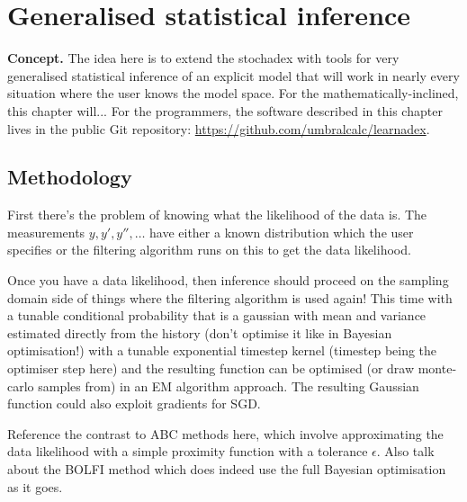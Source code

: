 \chapter{\sffamily Generalised statistical inference}

{\bfseries\sffamily Concept.} The idea here is to extend the stochadex with tools for very generalised statistical inference of an explicit model that will work in nearly every situation where the user knows the model space. For the mathematically-inclined, this chapter will... For the programmers, the software described in this chapter lives in the public Git repository: \href{https://github.com/umbralcalc/learnadex}{https://github.com/umbralcalc/learnadex}.


\section{\sffamily Methodology}

First there's the problem of knowing what the likelihood of the data is. The measurements $y, y', y'', \dots$ have either a known distribution which the user specifies or the filtering algorithm runs on this to get the data likelihood.

Once you have a data likelihood, then inference should proceed on the sampling domain side of things where the filtering algorithm is used again! This time with a tunable conditional probability that is a gaussian with mean and variance estimated directly from the history (don't optimise it like in Bayesian optimisation!) with a tunable exponential timestep kernel (timestep being the optimiser step here) and the resulting function can be optimised (or draw monte-carlo samples from) in an EM algorithm approach. The resulting Gaussian function could also exploit gradients for SGD.

Reference the contrast to ABC methods here, which involve approximating the data likelihood with a simple proximity function with a tolerance $\epsilon$. Also talk about the BOLFI method which does indeed use the full Bayesian optimisation as it goes.

